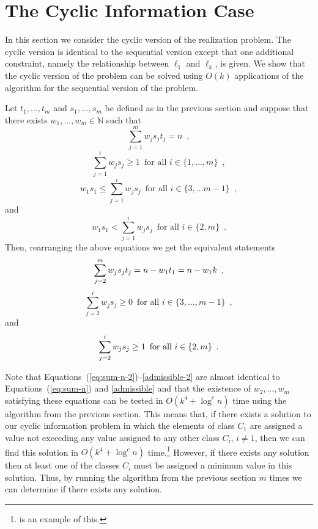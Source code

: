 \documentclass{elsart}
\newcommand{\N}{\mathbb{N}}
\begin{document}
\section{The Cyclic Information Case}

In this section we consider the cyclic version of the realization
problem.  The cyclic version is identical to the sequential version
except that one additional constraint, namely the relationship between
$\ell_1$ and $\ell_k$, is given.  We show that the cyclic version of
the problem can be solved using $O(k)$ applications of the algorithm
for the sequential version of the problem.  

Let $t_1,\ldots,t_m$ and $s_1,\ldots,s_m$ be defined as in the
previous section and suppose that there exists $w_1,\ldots,w_m\in\N$ such
that
\[
   \sum_{j=1}^m w_js_jt_j = n \enspace ,
\]
\[
  \sum_{j=1}^i w_js_j \ge 1 \enspace \mbox{for all $i\in \{1,\ldots,m\}$}
   \enspace ,
\]
\[
  w_1s_1 \le \sum_{j=1}^i w_js_j
     \enspace\mbox{for all $i\in\{ 3,\ldots m-1\}$}
     \enspace ,
\] 
and
\[
  w_1s_1 < \sum_{j=1}^i w_js_j
     \enspace\mbox{for all $i\in\{ 2,m\}$}
     \enspace .
\]
Then, rearranging the above equations we get the equivalent statements
\begin{equation}
\sum_{j=2}^m w_js_jt_j = n - w_1t_1 = n-w_1k  \eqlabel{sum-n-2}
\enspace ,
\end{equation}
\begin{equation}
   \sum_{j=2}^i w_js_j \ge 0
       \enspace\mbox{for all $i\in\{3,\ldots,m-1\}$}
       \enspace  , 
\end{equation}
and
\begin{equation}
   \sum_{j=2}^i w_js_j \ge 1
       \enspace\mbox{for all $i\in\{2,m\}$}
       \enspace .  \eqlabel{admissible-2}
\end{equation}

Note that Equations~(\ref{eq:sum-n-2})--\eqref{admissible-2} are
almost identical to Equations~(\ref{eq:sum-n}) and \eqref{admissible}
and that the existence of $w_2,\ldots,w_m$ satisfying these equations
can be tested in $O(k^4+\log^c n)$ time using the algorithm from the
previous section.  This means that, if there exists a solution to our
cyclic information problem in which the elements of class $C_1$ are
assigned a value not exceeding any value assigned to any other class
$C_i$, $i\neq 1$, then we can find this solution in $O(k^4+\log^c n)$
time.\footnote{ is an example of this.}
However, if there exists any solution then at least one of the
classes $C_i$ must be assigned a minimum value in this solution.
Thus, by running the algorithm from the previous section $m$ times we
can determine if there exists any solution.
\end{document}
